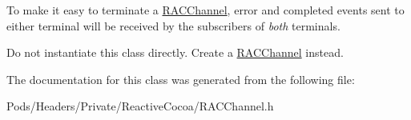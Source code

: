 To make it easy to terminate a \mbox{\hyperlink{interface_r_a_c_channel}{R\+A\+C\+Channel}}, {\ttfamily error} and {\ttfamily completed} events sent to either terminal will be received by the subscribers of {\itshape both} terminals.

Do not instantiate this class directly. Create a \mbox{\hyperlink{interface_r_a_c_channel}{R\+A\+C\+Channel}} instead. 

The documentation for this class was generated from the following file\+:\begin{DoxyCompactItemize}
\item 
Pods/\+Headers/\+Private/\+Reactive\+Cocoa/R\+A\+C\+Channel.\+h\end{DoxyCompactItemize}
